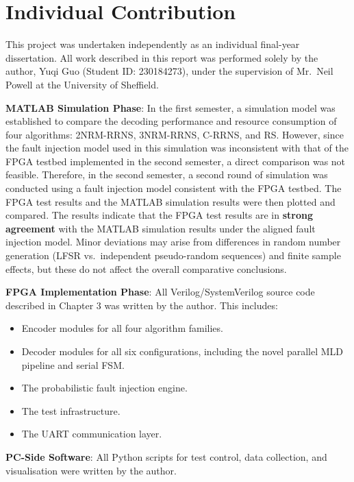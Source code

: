 \section{Individual Contribution}\label{individual-contribution}

This project was undertaken independently as an individual final-year
dissertation. All work described in this report was performed solely by
the author, Yuqi Guo (Student ID: 230184273), under the supervision of
Mr.~Neil Powell at the University of Sheffield.

\textbf{MATLAB Simulation Phase}: In the first semester, a simulation
model was established to compare the decoding performance and resource
consumption of four algorithms: 2NRM-RRNS, 3NRM-RRNS, C-RRNS, and RS.
However, since the fault injection model used in this simulation was
inconsistent with that of the FPGA testbed implemented in the second
semester, a direct comparison was not feasible. Therefore, in the second
semester, a second round of simulation was conducted using a fault
injection model consistent with the FPGA testbed. The FPGA test results
and the MATLAB simulation results were then plotted and compared. The
results indicate that the FPGA test results are in \textbf{strong
agreement} with the MATLAB simulation results under the aligned fault
injection model. Minor deviations may arise from differences in random
number generation (LFSR vs.~independent pseudo-random sequences) and
finite sample effects, but these do not affect the overall comparative
conclusions.

\textbf{FPGA Implementation Phase}: All Verilog/SystemVerilog source
code described in Chapter 3 was written by the author. This includes:

\begin{itemize}
\tightlist
\item
  Encoder modules for all four algorithm families.
\item
  Decoder modules for all six configurations, including the novel
  parallel MLD pipeline and serial FSM.
\item
  The probabilistic fault injection engine.
\item
  The test infrastructure.
\item
  The UART communication layer.
\end{itemize}

\textbf{PC-Side Software}: All Python scripts for test control, data
collection, and visualisation were written by the author.

